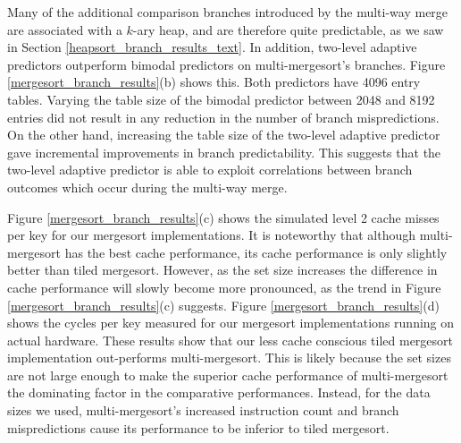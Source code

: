 \documentclass[acmtocl]{acmtrans2m}
\begin{document}
Many of the additional comparison branches introduced by the multi-way merge are
associated with a $k$-ary heap, and are therefore quite predictable, as we saw
in Section \ref{heapsort_branch_results_text}. In addition, two-level adaptive
predictors outperform bimodal predictors on multi-mergesort's branches.  Figure
\ref{mergesort_branch_results}(b) shows this. Both predictors have 4096 entry
tables. Varying the table size of the bimodal predictor between 2048 and 8192
entries did not result in any reduction in the number of branch mispredictions.
On the other hand, increasing the table size of the two-level adaptive predictor
gave incremental improvements in branch predictability. This suggests that the
two-level adaptive predictor is able to exploit correlations between branch
outcomes which occur during the multi-way merge.

Figure \ref{mergesort_branch_results}(c) shows the simulated level 2 cache
misses per key for our mergesort implementations. It is noteworthy that although
multi-mergesort has the best cache performance, its cache performance is only
slightly better than tiled mergesort. However, as the set size increases the
difference in cache performance will slowly become more pronounced, as the trend
in Figure \ref{mergesort_branch_results}(c) suggests.  Figure
\ref{mergesort_branch_results}(d) shows the cycles per key measured for our
mergesort implementations running on actual hardware. These results show that
our less cache conscious tiled mergesort implementation out-performs
multi-mergesort. This is likely because the set sizes are not large enough to
make the superior cache performance of multi-mergesort the dominating factor in
the comparative performances. Instead, for the data sizes we used,
multi-mergesort's increased instruction count and branch mispredictions cause
its performance to be inferior to tiled mergesort.
\end{document}
